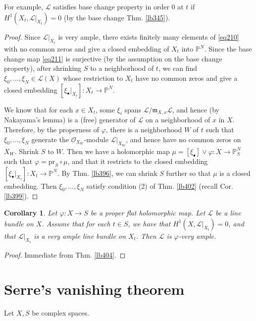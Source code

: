 \documentclass[12pt,b5paper,notitlepage]{report}
\theoremstyle{definition}
\theoremstyle{plain}
\newtheorem{co}[df]{Corollary}
\newcommand{\scr}{\mathscr}
\newcommand{\blt}{\bullet}
\newcommand{\Pbb}{\mathbb P}
\newcommand{\pr}{\mathrm {pr}}
\newcommand{\mk}{\mathfrak m}
\numberwithin{equation}{section}
\begin{document}
For example, $\scr L$ satisfies base change property in order $0$ at $t$ if $H^1(X_t,\scr L|_{X_t})=0$ (by the base change Thm. \ref{lb345}).


\begin{proof}
Since $\scr L|_{X_t}$ is very ample, there exists finitely many elements of \eqref{eq210} with no common zeros and give a closed embedding of $X_t$ into $\Pbb^N$. Since the base change map \eqref{eq211} is surjective (by the assumption on the base change property), after shrinking $S$ to a neighborhood of $t$, we can find $\xi_0,\dots,\xi_N\in\scr L(X)$ whose restriction to $X_t$ have no common zeros and give a closed embedding $[\xi_\blt|_{X_t}]:X_t\rightarrow\Pbb^N$.

We know that for each $x\in X_t$, some $\xi_i$ spans $\scr L/\mk_{X,x}\scr L$, and hence (by Nakayama's lemma) is a (free) generator of $\scr L$ on a neighborhood of $x$ in $X$. Therefore, by the properness of $\varphi$, there is a neighborhood $W$ of $t$ such that $\xi_0,\dots,\xi_N$ generate the $\scr O_{X_W}$-module $\scr L|_{X_W}$, and hence have no common zeros on $X_W$. Shrink $S$ to $W$. Then we have a holomorphic map $\mu=[\xi_\blt]\vee\varphi:X\rightarrow \Pbb^N_S$ such that $\varphi=\pr_S\circ\mu$, and that it restricts to the closed embedding $[\xi_\blt|_{X_t}]:X_t\rightarrow\Pbb^N$. By Thm. \ref{lb396}, we can shrink $S$ further so that $\mu$ is a closed embedding. Then $\xi_0,\dots,\xi_N$ satisfy condition (2) of Thm. \ref{lb402} (recall Cor. \ref{lb399}).
\end{proof}


\begin{co}
Let $\varphi:X\rightarrow S$ be a proper flat holomorphic map. Let $\scr L$ be a line bundle on $X$. Assume that for each $t\in S$, we have that $H^1(X,\scr L|_{X_t})=0$, and that $\scr L|_{X_t}$ is a very ample line bundle on $X_t$. Then $\scr L$ is $\varphi$-very ample.
\end{co}



\begin{proof}
Immediate from Thm. \ref{lb404}.
\end{proof}





\section{Serre's vanishing theorem}


Let $X,S$ be complex spaces.
\end{document}
